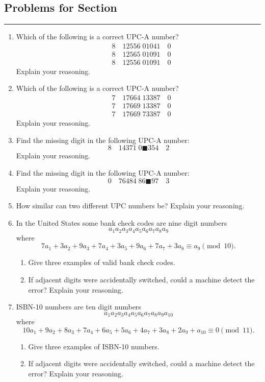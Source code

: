 \subsection*{Problems for Section \thesection}\hrule\vspace{1ex}
\begin{enumerate}

\item Which of the following is a correct UPC-A number?%
\begin{align*}
&8\quad12556\;01041\quad0\\
&8\quad12565\;01091\quad0\\
&8\quad12556\;01091\quad0
\end{align*}
Explain your reasoning.


\item  Which of the following is a correct UPC-A number?%
\begin{align*}
&7\quad17664\;13387\quad0\\
&7\quad17669\;13387\quad0\\
&7\quad17669\;73387\quad0
\end{align*}
Explain your reasoning.


\item Find the missing digit in the following UPC-A number:
\[
8\quad14371\;0\blacksquare354\quad2
\]
Explain your reasoning.

\item Find the missing digit in the following UPC-A number:
\[
0\quad76484\;86\blacksquare97\quad3
\]
Explain your reasoning.

\item How similar can two different UPC numbers be? Explain your
  reasoning.
\item In the United States some bank check codes are nine digit
  numbers
\[
a_1 a_2 a_3 a_4 a_5 a_6 a_7 a_8 a_9
\] 
where
\[
7a_1 + 3a_2 + 9a_3 + 7a_4 + 3a_5 + 9a_6 + 7 a_7 + 3a_8 \equiv a_9 \pmod{10}.
\]
\begin{enumerate}
\item Give three examples of valid bank check codes.
\item If adjacent digits were accidentally switched, could a machine
  detect the error? Explain your reasoning.
\end{enumerate}
\item ISBN-10 numbers are ten digit
  numbers
\[
a_1 a_2 a_3 a_4 a_5 a_6 a_7 a_8 a_9 a_{10}
\] 
where
\[
10a_1 + 9a_2 + 8a_3 + 7a_4 + 6a_5 + 5a_6 + 4a_7 + 3a_8 +2a_9+a_{10}\equiv 0 \pmod{11}.
\]
\begin{enumerate}
\item Give three examples of ISBN-10 numbers.
\item If adjacent digits were accidentally switched, could a machine
  detect the error? Explain your reasoning.
\end{enumerate}
\end{enumerate}

